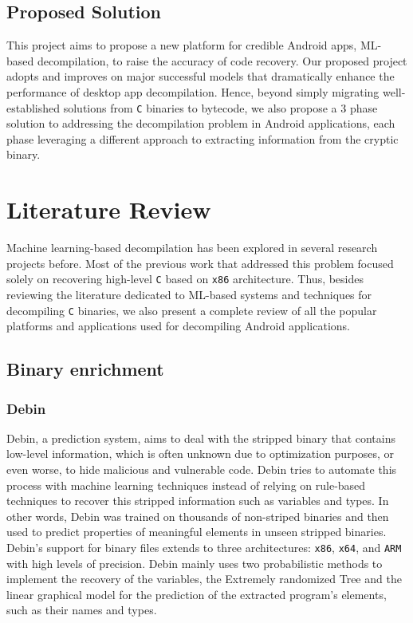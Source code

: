 \documentclass[conference,a4paper]{IEEEtran}
\begin{document}
\subsection{Proposed Solution}
This project aims to propose a new platform for credible Android apps, ML-based decompilation, to raise the accuracy of code recovery.
Our proposed project adopts and improves on major successful models that dramatically enhance the performance of desktop app decompilation.
Hence, beyond simply migrating well-established solutions from \verb|C| binaries to bytecode, we also propose a 3 phase solution to addressing the decompilation problem in Android applications, each phase leveraging a different approach to extracting information from the cryptic binary.

\section{Literature Review}
Machine learning-based decompilation has been explored in several research projects before.
Most of the previous work that addressed this problem focused solely on recovering high-level \verb|C| based on \verb|x86| architecture.
Thus, besides reviewing the literature dedicated to ML-based systems and techniques for decompiling \verb|C| binaries, we also present a complete review of all the popular platforms and applications used for decompiling Android applications. 


\subsection{Binary enrichment}

\subsubsection{Debin}

Debin, a prediction system, aims to deal with the stripped binary that contains low-level information, which is often unknown due to optimization purposes, or even worse, to hide malicious and vulnerable code.
Debin tries to automate this process with machine learning techniques instead of relying on rule-based techniques to recover this stripped information such as variables and types. In other words, Debin was trained on thousands of non-striped binaries and then used to predict properties of meaningful elements in unseen stripped binaries.
Debin's support for binary files extends to three architectures: \verb|x86|, \verb|x64|, and \verb|ARM| with high levels of precision.
Debin mainly uses two probabilistic methods to implement the recovery of the variables, the Extremely randomized Tree and the linear graphical model for the prediction of the extracted program's elements, such as their names and types.
\end{document}
